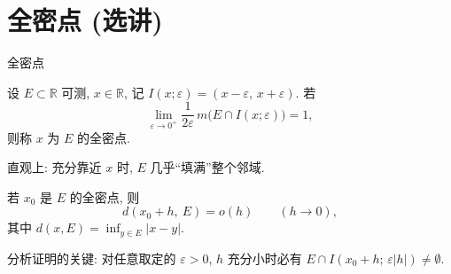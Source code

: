 
\section[全密点]{全密点 (选讲)}


\begin{frame}{全密点}

\begin{Def}[全密点]
设 $E \subset \mathbb{R}$ 可测, $x \in \mathbb{R}$, 记 $I(x; \varepsilon) = (x - \varepsilon,\, x + \varepsilon)$. 若
\[
\lim_{\varepsilon \to 0^+} \frac{1}{2\varepsilon}\, m\big(E \cap I(x; \varepsilon)\big) = 1,
\]
则称 $x$ 为 $E$ 的\alert{全密点}.
\end{Def}

直观上: 充分靠近 $x$ 时, $E$ 几乎``填满''整个邻域.

\pause

\begin{prop}
若 $x_0$ 是 $E$ 的全密点, 则
\[
d(x_0 + h,\ E) = o(h) \qquad (h \to 0),
\]
其中 $d(x, E) = \inf_{y \in E} |x - y|$.
\end{prop}

\begin{remark}
分析证明的关键: 对任意取定的 $\varepsilon > 0$, $h$ 充分小时必有 $E \cap I(x_0 + h;\, \varepsilon |h|) \neq \emptyset$.
\end{remark}

\end{frame}


